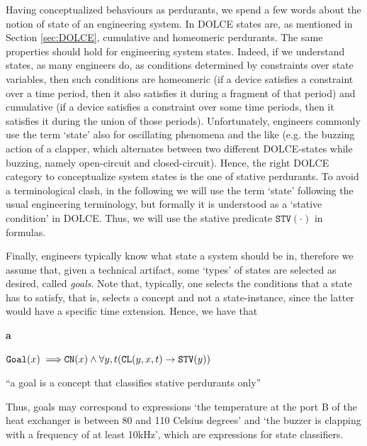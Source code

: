 \documentclass[sw]{iosart2x}
\newcommand{\bflist}{\begin{list}{}{\setlength{\topsep}{2mm}\setlength{\partopsep}{0mm}\setlength{\parsep}{0mm}\setlength{\leftmargin}{9mm}\setlength{\labelwidth}{8mm}}}
\newcommand{\eflist}{\end{list}}
\newcommand{\AxLabel}{\textrm{a}}
\newcounter{cntax}
\newcommand{\myax}[1]{\refstepcounter{cntax}\begin{small}{\bf \AxLabel\thecntax\label{ax:#1}}\end{small}}
\newcommand{\mytext}[1]{``#1''}
\newcommand{\generalStyle}[1]{\texttt{#1}}
\newcommand{\uniRel}[2]{\generalStyle{#1}(#2)}
\newcommand{\triRel}[4]{\generalStyle{#1}(#2,#3,#4)}
\newcommand{\myfi}{\hspace{0.9mm} \Longrightarrow}
\newcommand{\DOLCE}{\textsc{DOLCE}\xspace} %
\newcommand{\DOLCEStative}[1]{\uniRel{{STV}}{#1}}
\newcommand{\DOLCEConcept}[1]{\uniRel{{CN}}{#1}}
\newcommand{\DOLCECLby}[3]{\triRel{CL}{#1}{#2}{#3}}
\newcommand{\Goal}[1]{\uniRel{Goal}{#1}}
\newcommand{\firstTimeKeyWord}[1]{\textit{#1}}
\newcommand{\stateVarCond}[1]{%
  \ifthenelse{\equal{#1}{fullSingular}}{system condition}{%
    \ifthenelse{\equal{#1}{shortSingular}}{condition}{%
      \ifthenelse{\equal{#1}{fullPlural}}{system conditions}{%
        \ifthenelse{\equal{#1}{shortPlural}}{conditions}{%
          ERROR!%
        }%
      }%
    }%
  }%
}
\newcommand{\quotes}[1]{`#1'}
\newcommand{\TODO}[1]{{%
}}
\begin{document}
Having conceptualized behaviours as perdurants, we spend a few words about the notion of state of an engineering system.
In \DOLCE states are, as mentioned in Section \ref{sec:DOLCE}, cumulative and homeomeric perdurants.
The same properties should hold for engineering system states.
Indeed, if we understand states, as many engineers do, as conditions determined by constraints over state variables, then such conditions are homeomeric (if a device satisfies a constraint over a time period, then it also satisfies it during a fragment of that period) and cumulative (if a device satisfies a constraint over some time periods, then it satisfies it during the union of those periods).
Unfortunately, engineers commonly use the term \quotes{state} also for oscillating phenomena and the like (e.g. the buzzing action of a clapper, which alternates between two different \DOLCE-states while buzzing, namely open-circuit and closed-circuit). 
Hence, the right \DOLCE category to conceptualize system states is the one of stative perdurants. 
To avoid a terminological clash, in the following we will use the term \quotes{state} following the usual engineering terminology, but formally it is understood as a \quotes{stative condition} in \DOLCE. Thus, we will use the stative predicate $\DOLCEStative{\cdot}$ in formulas.

Finally, engineers typically know what state a system should be in,
therefore we assume that, given a technical artifact, some `types' of states are selected as desired, called \firstTimeKeyWord{goals}. Note that, typically, one selects the conditions that a state has to satisfy, that is, selects a concept 
and not a state-instance, since the latter would have a specific time extension. 
Hence, we have that
\bflist
\item[\myax{goalSubsum}] $ \Goal{x} \myfi \DOLCEConcept{x} \land \forall y,t (\DOLCECLby{y}{x}{t} \to \DOLCEStative{y})$
  \item \mytext{a goal is a concept that classifies stative perdurants only}
\eflist
Thus, goals may correspond to expressions \quotes{the temperature at the port B of the heat exchanger is between 80 and 110 Celsius degrees} and \quotes{the buzzer is clapping with a frequency of at least 10kHz}, which are expressions for state classifiers.


\end{document}
